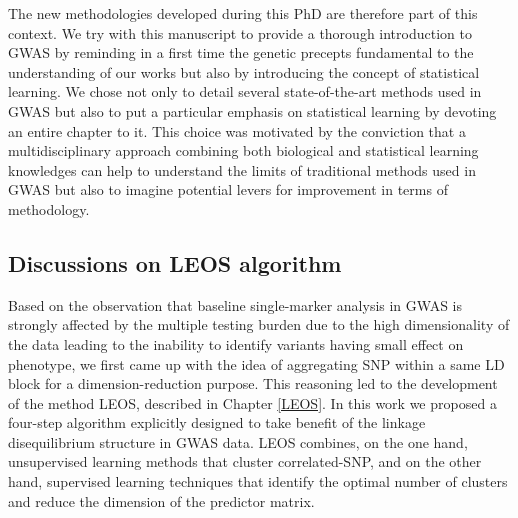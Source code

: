 \documentclass[]{book}
\begin{document}
The new methodologies developed during this PhD are therefore part of
this context. We try with this manuscript to provide a thorough
introduction to GWAS by reminding in a first time the genetic precepts
fundamental to the understanding of our works but also by introducing
the concept of statistical learning. We chose not only to detail several
state-of-the-art methods used in GWAS but also to put a particular
emphasis on statistical learning by devoting an entire chapter to it.
This choice was motivated by the conviction that a multidisciplinary
approach combining both biological and statistical learning knowledges
can help to understand the limits of traditional methods used in GWAS
but also to imagine potential levers for improvement in terms of
methodology.

\hypertarget{discussions-on-leos-algorithm}{%
\subsection*{Discussions on LEOS algorithm}\label{discussions-on-leos-algorithm}}

Based on the observation that baseline single-marker analysis in GWAS is
strongly affected by the multiple testing burden due to the high
dimensionality of the data leading to the inability to identify variants
having small effect on phenotype, we first came up with the idea of
aggregating SNP within a same LD block for a dimension-reduction
purpose. This reasoning led to the development of the method LEOS,
described in Chapter \ref{LEOS}. In this work we proposed a four-step
algorithm explicitly designed to take benefit of the linkage
disequilibrium structure in GWAS data. LEOS combines, on the one hand,
unsupervised learning methods that cluster correlated-SNP, and on the
other hand, supervised learning techniques that identify the optimal
number of clusters and reduce the dimension of the predictor matrix.
\end{document}
